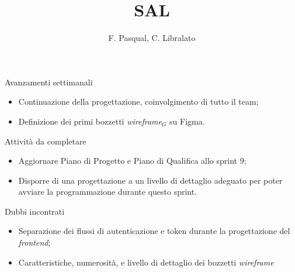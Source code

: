 \documentclass{beamer}
\title{SAL}
\author[F. Pasqual, C. Libralato]{F. Pasqual, C. Libralato}
\begin{document}
{
\begin{frame}
  \titlepage
\end{frame}
}

\makeMembersFrame

\begin{frame}{Avanzamenti settimanali}
  \begin{itemize}
    \item Continuazione della progettazione, coinvolgimento di tutto il team;
    \item Definizione dei primi bozzetti \textit{wireframe$_G$} su Figma.
  \end{itemize}
\end{frame}



\renewcommand{\precedentTodoEntries}{}


\makePrecedentTodoFrame


\begin{frame}{Attività da completare}
  \begin{itemize}
    \item Aggiornare Piano di Progetto e Piano di Qualifica allo sprint 9;
    \item Disporre di una progettazione a un livello di dettaglio adeguato per poter avviare la programmazione durante questo sprint.
  \end{itemize}
\end{frame}

\begin{frame}{Dubbi incontrati}
  \begin{itemize}
    \item Separazione dei flussi di autenticazione e token durante la progettazione del \textit{frontend};
    \item Caratteristiche, numerosità, e livello di dettaglio dei bozzetti \textit{wireframe}
  \end{itemize}
\end{frame}
\end{document}
